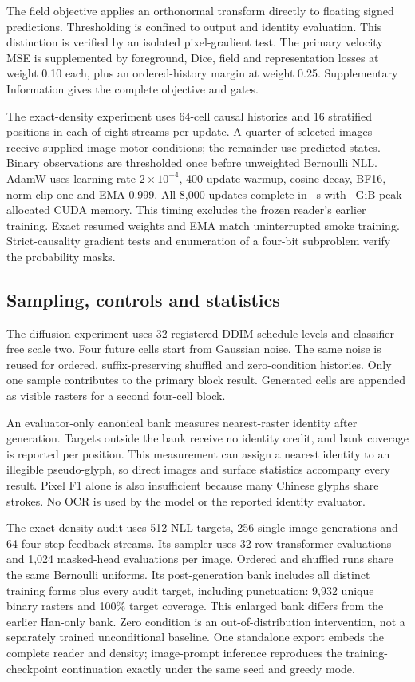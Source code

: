 The field objective applies an orthonormal transform directly to floating
signed predictions. Thresholding is confined to output and identity
evaluation. This distinction is verified by an isolated pixel-gradient test.
The primary velocity MSE is supplemented by foreground, Dice, field and
representation losses at weight 0.10 each, plus an ordered-history margin at
weight 0.25. Supplementary Information gives the complete objective and gates.

The exact-density experiment uses 64-cell causal histories and 16 stratified
positions in each of eight streams per update. A quarter of selected images
receive supplied-image motor conditions; the remainder use predicted states.
Binary observations are thresholded once before unweighted Bernoulli NLL.
AdamW uses learning rate $2\times10^{-4}$, 400-update warmup, cosine decay,
BF16, norm clip one and EMA 0.999. All 8,000 updates complete in
\DensitySeconds\ s with \DensityMemory\ GiB peak allocated CUDA memory.
This timing excludes the frozen reader's earlier training. Exact resumed
weights and EMA match uninterrupted smoke training. Strict-causality gradient
tests and enumeration of a four-bit subproblem verify the probability masks.

\subsection*{Sampling, controls and statistics}
The diffusion experiment uses 32 registered DDIM schedule levels and classifier-free scale
two. Four future cells start from Gaussian noise. The same noise is reused for
ordered, suffix-preserving shuffled and zero-condition histories. Only one
sample contributes to the primary block result. Generated cells are appended
as visible rasters for a second four-cell block.

An evaluator-only canonical bank measures nearest-raster identity after
generation. Targets outside the bank receive no identity credit, and bank
coverage is reported per position. This measurement can assign a nearest
identity to an illegible pseudo-glyph, so direct images and surface statistics
accompany every result. Pixel F1 alone is also insufficient because many
Chinese glyphs share strokes. No OCR is used by the model or the reported
identity evaluator.

The exact-density audit uses 512 NLL targets, 256 single-image generations and
64 four-step feedback streams. Its sampler uses 32 row-transformer evaluations
and 1,024 masked-head evaluations per image. Ordered and shuffled runs share
the same Bernoulli uniforms. Its post-generation bank includes all distinct
training forms plus every audit target, including punctuation: 9,932 unique
binary rasters and 100\% target coverage. This enlarged bank differs from the
earlier Han-only bank. Zero condition is an out-of-distribution intervention,
not a separately trained unconditional baseline. One standalone export embeds
the complete reader and density; image-prompt inference reproduces the
training-checkpoint continuation exactly under the same seed and greedy mode.


